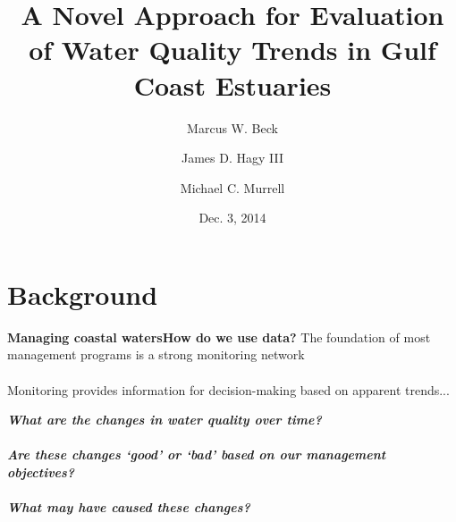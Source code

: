 \documentclass[serif]{beamer}\usepackage[]{graphicx}\usepackage[]{color}
\newcommand{\emtxt}[1]{\textbf{\textit{#1}}}
\begin{document}
\title[Trend Evaluation in Gulf Estuaries]{\textbf{A Novel Approach for Evaluation of Water Quality Trends in Gulf Coast Estuaries}}
\author[Beck, Hagy, Murrell]{Marcus W. Beck \and James D. Hagy III \and Michael C. Murrell}


\date{Dec. 3, 2014}


\begin{frame}[shrink]
\titlepage
\end{frame}

\section{Background}

\begin{frame}{\textbf{Managing coastal waters}}{\textbf{How do we use data?}}
The foundation of most management programs is a strong monitoring network \\~\\
Monitoring provides information for decision-making based on apparent trends...
\vspace{0.2in}
\begin{center}
\emtxt{What are the changes in water quality over time?}\\~\\
\emtxt{Are these changes `good' or `bad' based on our management objectives?}\\~\\
\emtxt{What may have caused these changes?}
\end{center}
\end{frame}
\end{document}
